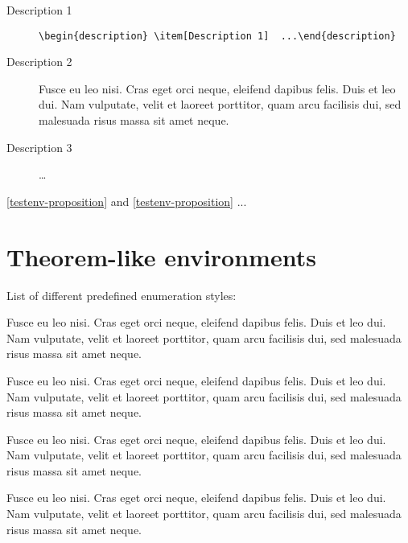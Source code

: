 \documentclass[a4paper,UKenglish,cleveref, autoref, thm-restate, anonymous]{lipics-v2021}
\begin{document}
\begin{description}
\item[Description 1] \verb|\begin{description} \item[Description 1]  ...\end{description}|
\item[Description 2] Fusce eu leo nisi. Cras eget orci neque, eleifend dapibus felis. Duis et leo dui. Nam vulputate, velit et laoreet porttitor, quam arcu facilisis dui, sed malesuada risus massa sit amet neque.
\item[Description 3]  \dots
\end{description}

\cref{testenv-proposition} and \autoref{testenv-proposition} ...

\section{Theorem-like environments}\label{sec:theorem-environments}

List of different predefined enumeration styles:

\begin{theorem}\label{testenv-theorem}
Fusce eu leo nisi. Cras eget orci neque, eleifend dapibus felis. Duis et leo dui. Nam vulputate, velit et laoreet porttitor, quam arcu facilisis dui, sed malesuada risus massa sit amet neque.
\end{theorem}

\begin{lemma}\label{testenv-lemma}
Fusce eu leo nisi. Cras eget orci neque, eleifend dapibus felis. Duis et leo dui. Nam vulputate, velit et laoreet porttitor, quam arcu facilisis dui, sed malesuada risus massa sit amet neque.
\end{lemma}

\begin{corollary}\label{testenv-corollary}
Fusce eu leo nisi. Cras eget orci neque, eleifend dapibus felis. Duis et leo dui. Nam vulputate, velit et laoreet porttitor, quam arcu facilisis dui, sed malesuada risus massa sit amet neque.
\end{corollary}

\begin{proposition}\label{testenv-proposition}
Fusce eu leo nisi. Cras eget orci neque, eleifend dapibus felis. Duis et leo dui. Nam vulputate, velit et laoreet porttitor, quam arcu facilisis dui, sed malesuada risus massa sit amet neque.
\end{proposition}
\end{document}
